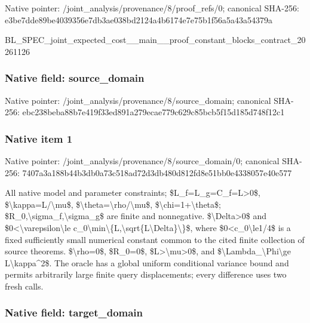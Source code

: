 \documentclass[10pt,a4paper]{article}
\begin{document}
Native pointer: /joint\_analysis/provenan\allowbreak{}ce/8/proof\_refs/0; canonical SHA-256: e3be7dde89be4039356e7db3\allowbreak{}ae038bd2124a4b6174e7e75b\allowbreak{}1f56a5a43a54379a


BL\_SPEC\_joint\_expected\_c\allowbreak{}ost\_\_main\_\_proof\_constan\allowbreak{}t\_blocks\_contract\_202611\allowbreak{}26


\subsubsection{Native field: source\_domain}


Native pointer: /joint\_analysis/provenan\allowbreak{}ce/8/source\_domain; canonical SHA-256: ebc238beba88b7e419f33ed8\allowbreak{}91a279ecae779c629c85bcb5\allowbreak{}f15d185d748f12c1



\subsubsection{Native item 1}


Native pointer: /joint\_analysis/provenan\allowbreak{}ce/8/source\_domain/0; canonical SHA-256: 7407a3a188b44b3db0a73c51\allowbreak{}8ad72d3db480d812fd8e51bb\allowbreak{}0e4338057e40e577


All native model and parameter constraints; \$L\_f=L\_g=C\_f=L>0\$, \$\textbackslash{}kappa=L/\textbackslash{}mu\$, \$\textbackslash{}theta=\textbackslash{}rho/\textbackslash{}mu\$, \$\textbackslash{}chi=1+\textbackslash{}theta\$; \$R\_0,\textbackslash{}sigma\_f,\textbackslash{}sigma\_g\$ are finite and nonnegative. \$\textbackslash{}Delta>0\$ and \$0<\textbackslash{}varepsilon\textbackslash{}le c\_0\textbackslash{}min\textbackslash{}\{L,\textbackslash{}sqrt\{L\textbackslash{}Delta\}\textbackslash{}\}\$, where \$0<c\_0\textbackslash{}le1/4\$ is a fixed sufficiently small numerical constant common to the cited finite collection of source theorems. \$\textbackslash{}rho=0\$, \$R\_0=0\$, \$L>\textbackslash{}mu>0\$, and \$\textbackslash{}Lambda\_\textbackslash{}Phi\textbackslash{}ge L\textbackslash{}kappa\textasciicircum{}2\$. The oracle has a global uniform conditional variance bound and permits arbitrarily large finite query displacements; every difference uses two fresh calls.


\subsubsection{Native field: target\_domain}
\end{document}
